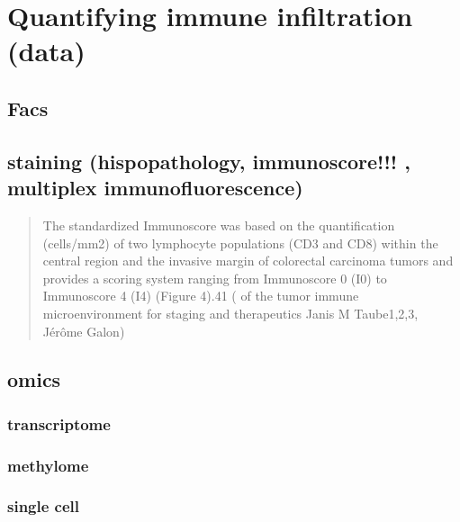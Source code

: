 \documentclass[12pt,]{book}
\theoremstyle{definition}
\theoremstyle{definition}
\theoremstyle{definition}
\theoremstyle{remark}
\begin{document}
\hypertarget{quantifying-immune-infiltration-data}{%
\section{Quantifying immune infiltration
(data)}\label{quantifying-immune-infiltration-data}}

\hypertarget{facs}{%
\subsection{Facs}\label{facs}}

\hypertarget{staining-hispopathology-immunoscore-multiplex-immunofluorescence}{%
\subsection{staining (hispopathology, immunoscore!!! , multiplex
immunofluorescence)}\label{staining-hispopathology-immunoscore-multiplex-immunofluorescence}}

\begin{quote}
The standardized Immunoscore was based on the quantification (cells/mm2)
of two lymphocyte populations (CD3 and CD8) within the central region
and the invasive margin of colorectal carcinoma tumors and provides a
scoring system ranging from Immunoscore 0 (I0) to Immunoscore 4 (I4)
(Figure 4).41 (\citet{Implications} of the tumor immune microenvironment
for staging and therapeutics Janis M Taube1,2,3, Jérôme Galon)
\end{quote}

\hypertarget{omics}{%
\subsection{omics}\label{omics}}

\hypertarget{transcriptome}{%
\subsubsection{transcriptome}\label{transcriptome}}

\hypertarget{methylome}{%
\subsubsection{methylome}\label{methylome}}

\hypertarget{single-cell}{%
\subsubsection{single cell}\label{single-cell}}
\end{document}
